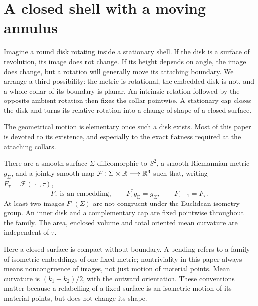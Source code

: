 \section{A closed shell with a moving annulus}
\label{sec:introduction}

Imagine a round disk rotating inside a stationary shell. If the disk
is a surface of revolution, its image does not change. If its height
depends on angle, the image does change, but a rotation will generally
move its attaching boundary. We arrange a third possibility: the
metric is rotational, the embedded disk is not, and a whole collar of
its boundary is planar. An intrinsic rotation followed by the opposite
ambient rotation then fixes the collar pointwise. A stationary cap
closes the disk and turns its relative rotation into a change of shape
of a closed surface.

The geometrical motion is elementary once such a disk exists. Most of
this paper is devoted to its existence, and especially to the exact
flatness required at the attaching collars.

\begin{maintheorem}\label{thm:main}
There are a smooth surface $\Sigma$ diffeomorphic to $S^2$, a smooth
Riemannian metric $g_\Sigma$, and a jointly smooth map
$\mathcal F:\Sigma\times\mathbb R\longrightarrow\mathbb R^3$ such that, writing
$F_\tau=\mathcal F(\,\cdot\,,\tau)$,
\[
 F_\tau\text{ is an embedding},\qquad
 F_\tau^*g_{\mathrm E}=g_\Sigma,\qquad F_{\tau+1}=F_\tau.
\]
At least two images $F_\tau(\Sigma)$ are not congruent under the
Euclidean isometry group. An inner disk and a complementary cap are
fixed pointwise throughout the family. The area, enclosed volume and
total oriented mean curvature are independent of $\tau$.
\end{maintheorem}

Here a closed surface is compact without boundary. A bending refers
to a family of isometric embeddings of one fixed metric; nontriviality
in this paper always means noncongruence of images, not just motion of
material points. Mean curvature is $(k_1+k_2)/2$, with the outward
orientation. These conventions matter because a relabelling of a
fixed surface is an isometric motion of its material points, but does
not change its shape.

